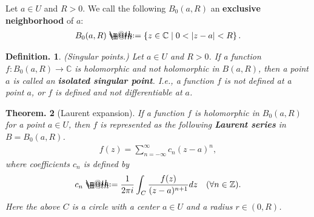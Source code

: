 \documentclass[openany, a4paper, oneside]{jsbook}
\makeatletter
\newcommand*{\defeq}{\mathrel{\rlap{%
\raisebox{0.3ex}{$\m@th\cdot$}}%
\raisebox{-0.3ex}{$\m@th\cdot$}}%
=}
\theoremstyle{break}
\theoremstyle{breakdefn}
\newtheorem{thm}{Theorem.}[section]
\newtheorem{defn}[thm]{Definition.}
\newcommand{\abs}[1]{\left|#1\right|}
\newcommand{\relmiddle}[1]{\mathrel{}\middle#1\mathrel{}}
\newcommand{\set}[2]{\left\{#1 \relmiddle| #2\right\}}
\newcommand{\bbC}{\mathbb{C}}
\newcommand{\bbZ}{\mathbb{Z}}
\newcommand{\upbf}[1]{\textup{\textbf{#1}}}
\makeatother
\begin{document}
Let $a \in U$ and $R > 0$.
We call the following $B_0 (a, R)$ an \textbf{exclusive neighborhood} of $a$:
\begin{align}
 B_0 (a, R)
 \defeq
 \set{z \in \bbC}{ 0 < \abs{z - a} < R}.
\end{align}
\begin{defn}\textup{(Singular points.)}
 Let $a \in U$ and $R > 0$.
 If a function $f \colon B_0 (a, R) \to \bbC$ is holomorphic and not holomorphic in $B (a, R)$,
 then a point $a$ is called an \upbf{isolated singular point}.
 I.e., a function $f$ is not defined at a point $a$, or $f$ is defined and not differentiable at $a$.
\end{defn}
\begin{thm}[Laurent expansion]
 If a function $f$ is holomorphic in $B_0 (a, R)$ for a point $a \in U$, then
 $f$ is represented as the following \upbf{Laurent series} in $B = B_0 (a, R)$.
 \begin{align}
  f (z)
  =
  \sum_{n= - \infty}^{\infty} c_n (z-a)^n,
 \end{align}
 where coefficients $c_n$ is defined by
 \begin{align}
  c_n
  \defeq
  \frac{1}{2 \pi i} \int_C \frac{f (z)}{(z - a)^{n+1}} dz \quad (\forall n \in \bbZ).
 \end{align}
 Here the above $C$ is a circle with a center $a \in U$ and a radius $r \in (0, R)$.
\end{thm}
\end{document}

